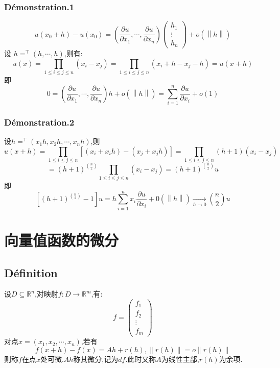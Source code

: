 \documentclass[12pt, a4paper, oneside]{ctexbook}
\begin{document}
    \subsubsection{Démonstration.1}
    $$
    u(x_0+h)-u(x_0)=(\frac{\partial u}{\partial x_1},\cdots,\frac{\partial u}{\partial x_n})
    \begin{pmatrix}
      h_1\\
      \vdots\\
      h_n
     \end{pmatrix}+o(\left\lVert h\right\rVert )
    $$
    设 $h=^\top(h,\cdots,h)$,则有:
    $$
    u(x)=\prod _{1\leq i\leq j\leq n}(x_i-x_j)=\prod _{1\leq i\leq j\leq n}(x_i+h-x_j-h)=u(x+h)
    $$
    即
    $$
    0=(\frac{\partial u}{\partial x_1},\cdots,\frac{\partial u}{\partial x_n})h+o(\left\lVert h\right\rVert )=\sum_{i = 1}^{n}  \frac{\partial u}{\partial x_i}+o(1)
    $$
    \subsubsection{Démonstration.2}
    设$h=^\top(x_1h,x_2h,\cdots,x_nh)$,则
    $$
    u(x+h)=\prod _{1\leq i\leq j\leq n}[(x_i+x_ih)-(x_j+x_jh)]=\prod _{1\leq i\leq j\leq n}(h+1)(x_i-x_j)
    $$
    $$
    =(h+1)^{\binom{n}{2} }\prod _{1\leq i\leq j\leq n}(x_i-x_j)=(h+1)^{\binom{n}{2} }u
    $$
    即
    $$
    [(h+1)^{\binom{n}{2} }-1]u=h\sum_{i = 1}^{n}  x_i \frac{\partial u}{\partial x_i}+0(\left\lVert h\right\rVert )\xrightarrow[h\rightarrow 0]{}{\binom{n}{2} }u
    $$
  \section{向量值函数的微分}
    \subsection{Définition}
    设$D\subseteq \mathbb{R}^n$,对映射$f:D\rightarrow \mathbb{R}^m$,有:
    $$
    f=\begin{pmatrix}
      f_1\\
      f_2\\
      \vdots\\
     f_m
     \end{pmatrix}
    $$
    对点$x=(x_1,x_2,\cdots,x_n)$,若有
    $$
    f(x+h)-f(x)=Ah+r(h),\left\lVert r(h) \right\rVert =o\left\lVert r(h) \right\rVert 
    $$
    则称$f$在点$x$处可微.$Ah$称其微分,记为$df$.此时又称$A$为线性主部,$r(h)$为余项.
\end{document}
